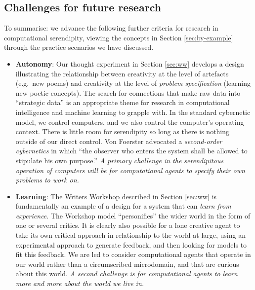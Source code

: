 \subsection{Challenges for future research} \label{sec:recommendations}

To summarise: we advance the following further criteria for research
in computational serendipity, viewing the concepts in Section
\ref{sec:by-example} through the practice scenarios we have discussed.

\begin{itemize}
\item \textbf{Autonomy}: Our thought experiment in Section
  \ref{sec:ww} develops a design illustrating the relationship between
  creativity at the level of artefacts (e.g.~new poems) and creativity
  at the level of \emph{problem specification} (learning new poetic
  concepts).  The search for connections that make raw data into
  ``strategic data'' is an appropriate theme for research in
  computational intelligence and machine learning to grapple with.  In
  the standard cybernetic model, we control computers, and we also
  control the computer's operating context.  There is little room for
  serendipity so long as there is nothing outside of our direct
  control. Von Foerster \citeyear[p. 286]{von2003cybernetics}
  advocated a \emph{second-order cybernetics} in which ``the observer
  who enters the system shall be allowed to stipulate his own
  purpose.''  \emph{A primary challenge in the serendipitous operation
    of computers will be for computational agents to specify their own
    problems to work on.}
\end{itemize}

\begin{itemize}
\item \textbf{Learning}: The Writers Workshop described in Section
  \ref{sec:ww} is fundamentally an example of a design for a system
  that can \emph{learn from experience}.  The Workshop model
  ``personifies'' the wider world in the form of one or several
  critics.  It is clearly also possible for a lone creative agent to
  take its own critical approach in relationship to the world at
  large, using an experimental approach to generate feedback, and then
  looking for models to fit this feedback.   We are led to consider 
  computational agents that operate in our world rather
  than a circumscribed microdomain, and that are curious about this
  world.  \emph{A second challenge is for computational agents to
    learn more and more about the world we live in.}
\end{itemize}

